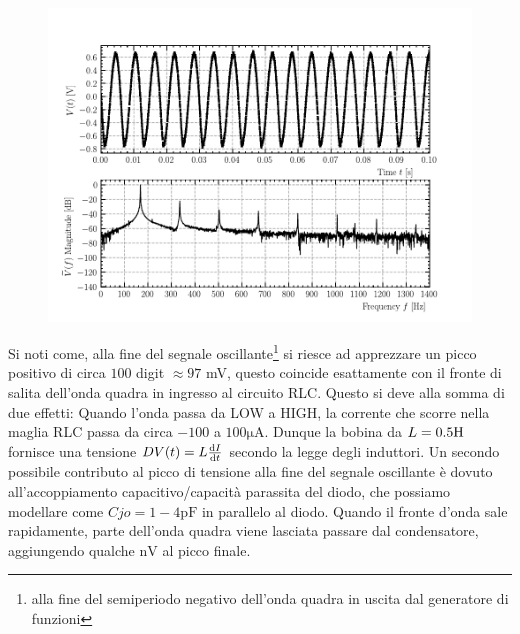 \documentclass{article}[a4paper, oneside, 11pt]
\begin{document}
\begin{figure}[!ht]
\centering
	\includegraphics{phs1_41.pdf}
\label{fig: phs1_41}
\end{figure}
Si noti come, alla fine del segnale oscillante\footnote{alla fine del
semiperiodo negativo dell'onda quadra in uscita dal generatore di funzioni}
si riesce ad apprezzare un picco positivo di circa $100$ digit $\approx 97$ mV,
questo coincide esattamente con il fronte di salita dell'onda quadra in
ingresso al circuito RLC.
Questo si deve alla somma di due effetti: Quando l'onda passa da LOW a
HIGH, la corrente che scorre nella maglia RLC passa da circa $-100$ a
$100 \si{\micro\A}$. Dunque la bobina da $L=0.5 \si{\H}$ fornisce una tensione
$DV(t) = L \frac{\mathrm{d} I}{\mathrm{d} t}$ secondo la legge degli induttori.
Un secondo possibile contributo al picco di tensione alla
fine del segnale oscillante è dovuto all'accoppiamento capacitivo/capacità
parassita del diodo, che possiamo modellare come $Cjo = 1-4 \si{\pico\farad}$
in parallelo al diodo. Quando il fronte d'onda sale rapidamente, parte dell'onda
quadra viene lasciata passare dal condensatore, aggiungendo qualche $\si{\nano\V}$
al picco finale.

\end{document}
